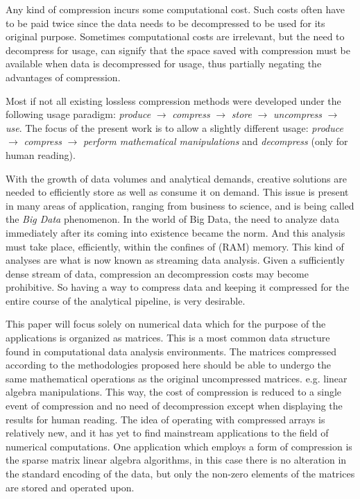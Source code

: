 \documentclass[10pt]{article}
\begin{document}
Any kind of compression incurs some computational cost. Such costs often have to be paid twice since the data needs to be decompressed to be used for its original purpose. Sometimes computational costs are irrelevant, but the need to decompress for usage, can signify that the space saved with compression must be available when data is decompressed for usage, thus partially negating the advantages of compression.

Most if not all existing lossless compression methods were developed under the following usage paradigm: \textit{produce} $\rightarrow$ \textit{compress} $\rightarrow$ \textit{store} $\rightarrow$ \textit{uncompress} $\rightarrow$ \textit{use}. The focus of the present work is to allow a slightly different usage:  \textit{produce} $\rightarrow$ \textit{compress} $\rightarrow$ \textit{perform mathematical manipulations} and \textit{decompress} (only for human reading).

With the growth of data volumes and analytical demands, creative solutions are needed to efficiently store as well as consume it on demand. This issue is present in many areas of application, ranging from business to science\cite{lynch}, and is being called the \textit{Big Data} phenomenon. In the world of Big Data, the need to analyze data immediately after its coming into existence became the norm. And this analysis must take place, efficiently, within the confines of (RAM) memory. This kind of analyses are what is now known as streaming data analysis\cite{gaber2005mining}. Given a sufficiently dense stream of data, compression an decompression costs may become prohibitive. So having a way to compress data and keeping it compressed for the entire course of the analytical pipeline, is very desirable.

This paper will focus solely on numerical data which for the purpose of the applications is organized as   matrices. This is a most common data structure found in computational data analysis environments. The matrices compressed according to the methodologies proposed here should be able to undergo the same mathematical operations as the original uncompressed matrices. e.g. linear algebra manipulations. This way, the cost of compression is reduced to a single event of compression and no need of decompression except when displaying the results for human reading. The idea of operating with compressed arrays is relatively new\cite{yemliha2007compiler}, and it has yet to find mainstream applications to the field of numerical computations. One application which employs a form of compression is the sparse matrix linear algebra algorithms\cite{dodson1991sparse}, in this case there is no alteration in the standard encoding of the data, but only the non-zero elements of the matrices are stored and operated upon. 
\end{document}
